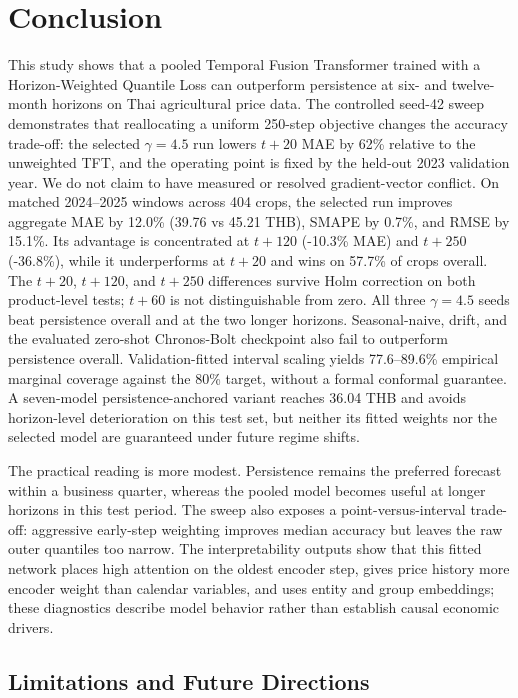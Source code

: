 \documentclass[review,3p,times]{elsarticle}
\begin{document}
\section{Conclusion}

This study shows that a pooled Temporal Fusion Transformer trained with a Horizon-Weighted Quantile Loss can outperform persistence at six- and twelve-month horizons on Thai agricultural price data. The controlled seed-42 sweep demonstrates that reallocating a uniform 250-step objective changes the accuracy trade-off: the selected $\gamma=4.5$ run lowers $t+20$ MAE by 62\% relative to the unweighted TFT, and the operating point is fixed by the held-out 2023 validation year. We do not claim to have measured or resolved gradient-vector conflict. On matched 2024--2025 windows across 404 crops, the selected run improves aggregate MAE by 12.0\% (39.76 vs 45.21 THB), SMAPE by 0.7\%, and RMSE by 15.1\%. Its advantage is concentrated at $t+120$ (-10.3\% MAE) and $t+250$ (-36.8\%), while it underperforms at $t+20$ and wins on 57.7\% of crops overall. The $t+20$, $t+120$, and $t+250$ differences survive Holm correction on both product-level tests; $t+60$ is not distinguishable from zero. All three $\gamma=4.5$ seeds beat persistence overall and at the two longer horizons. Seasonal-naive, drift, and the evaluated zero-shot Chronos-Bolt checkpoint also fail to outperform persistence overall. Validation-fitted interval scaling yields 77.6--89.6\% empirical marginal coverage against the 80\% target, without a formal conformal guarantee. A seven-model persistence-anchored variant reaches 36.04 THB and avoids horizon-level deterioration on this test set, but neither its fitted weights nor the selected model are guaranteed under future regime shifts.

The practical reading is more modest. Persistence remains the preferred forecast within a business quarter, whereas the pooled model becomes useful at longer horizons in this test period. The sweep also exposes a point-versus-interval trade-off: aggressive early-step weighting improves median accuracy but leaves the raw outer quantiles too narrow. The interpretability outputs show that this fitted network places high attention on the oldest encoder step, gives price history more encoder weight than calendar variables, and uses entity and group embeddings; these diagnostics describe model behavior rather than establish causal economic drivers.

\subsection{Limitations and Future Directions}
\end{document}

